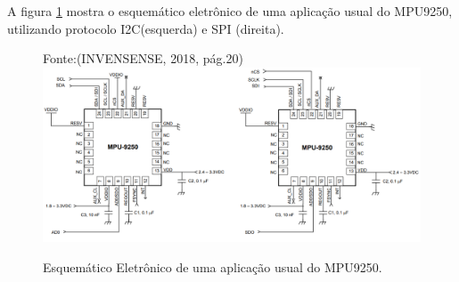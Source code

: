\begin{table}[h]
\centering
\caption{Informações técnicas sobre sensor MPU9250.}
\label{tab_ive}
\end{table}

A figura \ref{mpu} mostra o esquemático eletrônico de uma aplicação usual do MPU9250, utilizando protocolo I2C(esquerda) e SPI (direita).

\begin{figure}[h]
	\centering
    Fonte:(INVENSENSE, 2018, pág.20)\linebreak
	\includegraphics[keepaspectratio=true,scale=0.4]{figuras/mpu9250.PNG}
	\caption{Esquemático Eletrônico de uma aplicação usual do MPU9250.}
	\label{mpu}
\end{figure}

